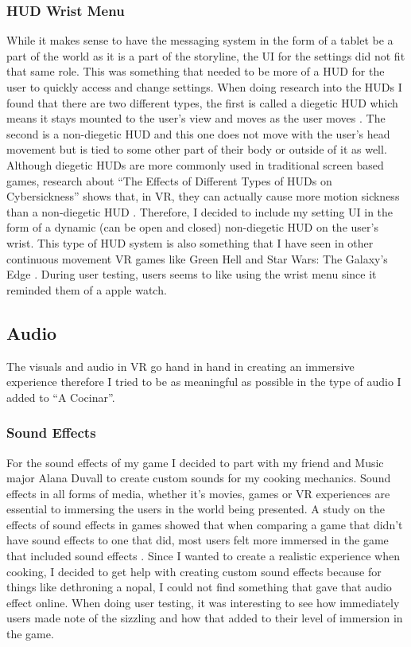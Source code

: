 \documentclass[10pt,twocolumn]{article}
\begin{document}
\subsubsection{HUD Wrist Menu}
While it makes sense to have the messaging system in the form of a tablet be a part of the world as it is a part of the storyline, the UI for the settings did not fit that same role. This was something that needed to be more of a HUD for the user to quickly access and change settings. When doing research into the HUDs I found that there are two different types, the first is called a diegetic HUD which means it stays mounted to the user's view and moves as the user moves \cite{HUDS2020}. The second is a non-diegetic HUD and this one does not move with the user’s head movement but is tied to some other part of their body or outside of it as well. Although diegetic HUDs are more commonly used in traditional screen based games, research about “The Effects of Different Types of HUDs on Cybersickness” shows that, in VR, they can actually cause more motion sickness than a non-diegetic HUD \cite{HUDS2020}. Therefore, I decided to include my setting UI in the form of a dynamic (can be open and closed) non-diegetic HUD on the user's wrist. This type of HUD system is also something that I have seen in other continuous movement VR games like Green Hell and Star Wars: The Galaxy’s Edge \cite{talesOfGlax2020}. During user testing, users seems to like using the wrist menu since it reminded them of a apple watch. 

\subsection{Audio}
The visuals and audio in VR go hand in hand in creating an immersive experience therefore I tried to be as meaningful as possible in the type of audio I added to “A Cocinar”.

\subsubsection{Sound Effects}
For the sound effects of my game I decided to part with my friend and Music major Alana Duvall to create custom sounds for my cooking mechanics. Sound effects in all forms of media, whether it’s movies, games or VR experiences are essential to immersing the users in the world being presented. A study on the effects of sound effects in games showed that when comparing a game that didn’t have sound effects to one that did, most users felt more immersed in the game that included sound effects \cite{audioIm2013}. Since I wanted to create a realistic experience when cooking, I decided to get help with creating custom sound effects because for things like dethroning a nopal, I could not find something that gave that audio effect online. When doing user testing, it was interesting to see how immediately users made note of the sizzling and how that added to their level of immersion in the game.
\end{document}
